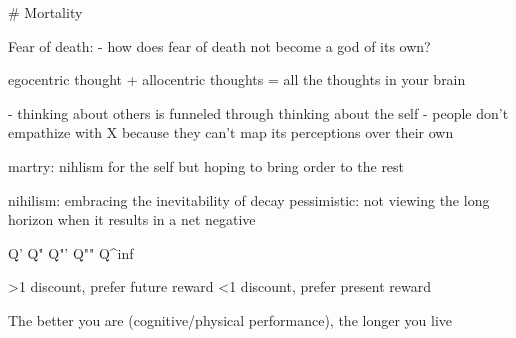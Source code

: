 # Mortality

Fear of death:
- how does fear of death not become a god of its own?

egocentric thought + allocentric thoughts = all the thoughts in your brain

- thinking about others is funneled through thinking about the self
    - people don't empathize with X because they can't map its perceptions over their own

martry: nihlism for the self but hoping to bring order to the rest

nihilism: embracing the inevitability of decay
pessimistic: not viewing the long horizon when it results in a net negative


Q' Q" Q"' Q"" Q^inf

>1 discount, prefer future reward
<1 discount, prefer present reward

The better you are (cognitive/physical performance), the longer you live